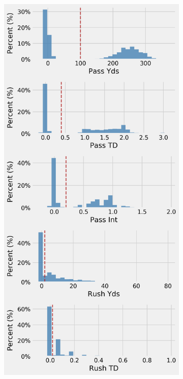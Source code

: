 \documentclass[12pt]{article}
\begin{document}
\begin{figure}[H]
  \centering
  \begin{subfigure}[b]{0.450\textwidth}
    \centering
    \includegraphics[width=1\textwidth]{../figures/no_threshold_hist_QB}

\end{subfigure}
\end{figure}
\end{document}
